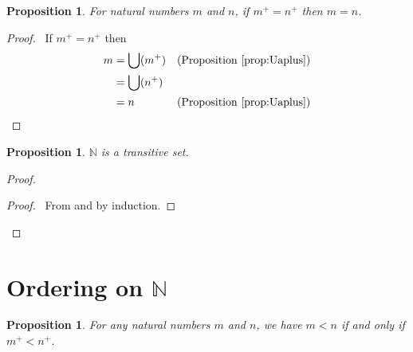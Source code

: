 \documentclass{book}
\let\qed\relax
\newtheorem{prop}[ax]{Proposition}
\theoremstyle{definition}
\begin{document}
\begin{prop}
\label{prop:Peano2}
For natural numbers $m$ and $n$, if $m^+ = n^+$ then $m = n$.
\end{prop}

\begin{proof}
	\pf\ If $m^+ = n^+$ then
	\begin{align*}
		m & = \bigcup (m^+) & (\text{Proposition \ref{prop:Uaplus}}) \\
		& = \bigcup (n^+) \\
		& = n & (\text{Proposition \ref{prop:Uaplus}})
	\end{align*}
\end{proof}
\begin{prop}
$\mathbb{N}$ is a transitive set.
\end{prop}

\begin{proof}
\pf
{}
\begin{proof}
	\pf\ From  and  by induction.
\end{proof}
\qed
\end{proof}

\section{Ordering on $\mathbb{N}$}

\begin{prop}
\label{prop:succltsucc}
For any natural numbers $m$ and $n$, we have $m < n$ if and only if $m^+ < n^+$.
\end{prop}
\end{document}
